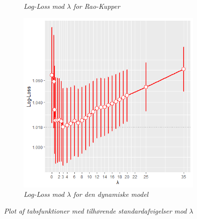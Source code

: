 \documentclass[11pt,a4paper]{article}
\begin{document}
\begin{figure}[h!]
\begin{subfigure}[b]{0.45\linewidth}
    \caption{\textit{Log-Loss mod $\lambda$ for Rao-Kupper}}
    \label{fig:LogLossBarStat}
  \end{subfigure}
  \hspace{0.2cm}
      \begin{subfigure}[b]{0.45\linewidth}
\includegraphics[width=\textwidth]{BARPLOTLOGALPHANY.png}
    \caption{\textit{Log-Loss mod $\lambda$ for den dynamiske model}}
    \label{fig:LogLossBarDyn}  
    \end{subfigure}
\caption{\textit{Plot af tabsfunktioner med tilhørende standardafvigelser mod $\lambda$ }}
  \label{fig:Tabsfunktioner}
\end{figure}
\end{document}
